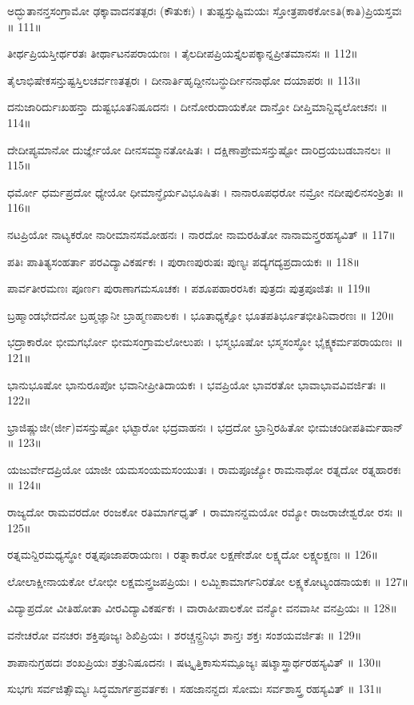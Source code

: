 ಅದ್ಭುತಾನನ್ತಸಂಗ್ರಾಮೋ ಢಕ್ಕಾವಾದನತತ್ಪರಃ (ಕೌತುಕಃ) ।
ತುಷ್ಟಸ್ತುಷ್ಟಿಮಯಃ ಸ್ತೋತ್ರಪಾಠಕೋಽತಿ(ಕಾತಿ)ಪ್ರಿಯಸ್ತವಃ ॥ 111॥

ತೀರ್ಥಪ್ರಿಯಸ್ತೀರ್ಥರತಃ ತೀರ್ಥಾಟನಪರಾಯಣಃ ।
ತೈಲದೀಪಪ್ರಿಯಸ್ತೈಲಪಕ್ಕಾನ್ನಪ್ರೀತಮಾನಸಃ ॥ 112॥

ತೈಲಾಭಿಷೇಕಸನ್ತುಷ್ಟಸ್ತಿಲಚರ್ವಣತತ್ಪರಃ ।
ದೀನಾರ್ತಿಹೃದ್ದೀನಬನ್ಧುರ್ದೀನನಾಥೋ ದಯಾಪರಃ ॥ 113॥

ದನುಜಾರಿರ್ದುಃಖಹನ್ತಾ ದುಷ್ಟಭೂತನಿಷೂದನಃ ।
ದೀನೋರುದಾಯಕೋ ದಾನ್ತೋ ದೀಪ್ತಿಮಾನ್ದಿವ್ಯಲೋಚನಃ ॥ 114॥

ದೇದೀಪ್ಯಮಾನೋ ದುರ್ಜ್ಞೇಯೋ ದೀನಸಮ್ಮಾನತೋಷಿತಃ ।
ದಕ್ಷಿಣಾಪ್ರೇಮಸನ್ತುಷ್ಟೋ ದಾರಿದ್ರಯಬಡಬಾನಲಃ ॥ 115॥

ಧರ್ಮೋ ಧರ್ಮಪ್ರದೋ ಧ್ಯೇಯೋ ಧೀಮಾನ್ಧೈರ್ಯವಿಭೂಷಿತಃ ।
ನಾನಾರೂಪಧರೋ ನಮ್ರೋ ನದೀಪುಲಿನಸಂಶ್ರಿತಃ ॥ 116॥

ನಟಪ್ರಿಯೋ ನಾಟ್ಯಕರೋ ನಾರೀಮಾನಸಮೋಹನಃ ।
ನಾರದೋ ನಾಮರಹಿತೋ ನಾನಾಮನ್ತ್ರರಹಸ್ಯವಿತ್ ॥ 117॥

ಪತಿಃ ಪಾತಿತ್ಯಸಂಹರ್ತಾ ಪರವಿದ್ಯಾವಿಕರ್ಷಕಃ ।
ಪುರಾಣಪುರುಷಃ ಪುಣ್ಯಃ ಪದ್ಯಗದ್ಯಪ್ರದಾಯಕಃ ॥ 118॥

ಪಾರ್ವತೀರಮಣಃ ಪೂರ್ಣಃ ಪುರಾಣಾಗಮಸೂಚಕಃ ।
ಪಶೂಪಹಾರರಸಿಕಃ ಪುತ್ರದಃ ಪುತ್ರಪೂಜಿತಃ ॥ 119॥

ಬ್ರಹ್ಮಾಂಡಭೇದನೋ ಬ್ರಹ್ಮಜ್ಞಾನೀ ಬ್ರಾಹ್ಮಣಪಾಲಕಃ ।
ಭೂತಾಧ್ಯಕ್ಷೋ ಭೂತಪತಿರ್ಭೂತಭೀತಿನಿವಾರಣಃ ॥ 120॥

ಭದ್ರಾಕಾರೋ ಭೀಮಗರ್ಭೋ ಭೀಮಸಂಗ್ರಾಮಲೋಲುಪಃ ।
ಭಸ್ಮಭೂಷೋ ಭಸ್ಮಸಂಸ್ಥೋ ಭೈಕ್ಷ್ಯಕರ್ಮಪರಾಯಣಃ ॥ 121॥

ಭಾನುಭೂಷೋ ಭಾನುರೂಪೋ ಭವಾನೀಪ್ರೀತಿದಾಯಕಃ ।
ಭವಪ್ರಿಯೋ ಭಾವರತೋ ಭಾವಾಭಾವವಿವರ್ಜಿತಃ ॥ 122॥

ಭ್ರಾಜಿಷ್ಣುಜೀ(ರ್ಜೀ)ವಸನ್ತುಷ್ಟೋ ಭಟ್ಟಾರೋ ಭದ್ರವಾಹನಃ ।
ಭದ್ರದೋ ಭ್ರಾನ್ತಿರಹಿತೋ ಭೀಮಚಂಡೀಪತಿರ್ಮಹಾನ್ ॥ 123॥

ಯಜುರ್ವೇದಪ್ರಿಯೋ ಯಾಜೀ ಯಮಸಂಯಮಸಂಯುತಃ ।
ರಾಮಪೂಜ್ಯೋ ರಾಮನಾಥೋ ರತ್ನದೋ ರತ್ನಹಾರಕಃ ॥ 124॥

ರಾಜ್ಯದೋ ರಾಮವರದೋ ರಂಜಕೋ ರತಿಮಾರ್ಗಧೃತ್ ।
ರಾಮಾನನ್ದಮಯೋ ರಮ್ಯೋ ರಾಜರಾಜೇಶ್ವರೋ ರಸಃ ॥ 125॥

ರತ್ನಮನ್ದಿರಮಧ್ಯಸ್ಥೋ ರತ್ನಪೂಜಾಪರಾಯಣಃ ।
ರತ್ನಾಕಾರೋ ಲಕ್ಷಣೇಶೋ ಲಕ್ಷ್ಯದೋ ಲಕ್ಷ್ಯಲಕ್ಷಣಃ ॥ 126॥

ಲೋಲಾಕ್ಷೀನಾಯಕೋ ಲೋಭೀ ಲಕ್ಷಮನ್ತ್ರಜಪಪ್ರಿಯಃ ।
ಲಮ್ಬಿಕಾಮಾರ್ಗನಿರತೋ ಲಕ್ಷ್ಯಕೋಟ್ಯಂಡನಾಯಕಃ ॥ 127॥

ವಿದ್ಯಾಪ್ರದೋ ವೀತಿಹೋತಾ ವೀರವಿದ್ಯಾವಿಕರ್ಷಕಃ ।
ವಾರಾಹೀಪಾಲಕೋ ವನ್ಯೋ ವನವಾಸೀ ವನಪ್ರಿಯಃ ॥ 128॥

ವನೇಚರೋ ವನಚರಃ ಶಕ್ತಿಪೂಜ್ಯಃ ಶಿಖಿಪ್ರಿಯಃ ।
ಶರಚ್ಚನ್ದ್ರನಿಭಃ ಶಾನ್ತಃ ಶಕ್ತಃ ಸಂಶಯವರ್ಜಿತಃ ॥ 129॥

ಶಾಪಾನುಗ್ರಹದಃ ಶಂಖಪ್ರಿಯಃ ಶತ್ರುನಿಷೂದನಃ ।
ಷಟ್ಕೃತ್ತಿಕಾಸುಸಮ್ಪೂಜ್ಯಃ ಷಟ್ಶಾಸ್ತ್ರಾರ್ಥರಹಸ್ಯವಿತ್ ॥ 130॥

ಸುಭಗಃ ಸರ್ವಜಿತ್ಸೌಮ್ಯಃ ಸಿದ್ಧಮಾರ್ಗಪ್ರವರ್ತಕಃ ।
ಸಹಜಾನನ್ದದಃ ಸೋಮಃ ಸರ್ವಶಾಸ್ತ್ರ ರಹಸ್ಯವಿತ್ ॥ 131॥

